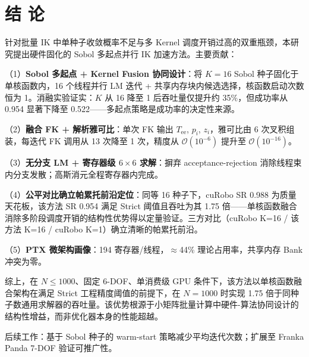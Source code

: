 \documentclass[twocolumn,a4paper,10pt]{ctexart}
\begin{document}
\FloatBarrier
\section{结 论}

针对批量 IK 中单种子收敛概率不足与多 Kernel 调度开销过高的双重瓶颈，本研究提出硬件固化的 Sobol 多起点并行 IK 加速方法。主要贡献：

（1）\textbf{Sobol 多起点 + Kernel Fusion 协同设计}：将 $K=16$ Sobol 种子固化于单核函数内，16 个线程并行 LM 迭代 + 共享内存块内候选选择，核函数启动次数恒为 1。消融实验证实：$K$ 从 16 降至 1 后吞吐量仅提升约 35\%，但成功率从 0.954 显著下降至 0.522——多起点策略是成功率的决定性来源。

（2）\textbf{融合 FK + 解析雅可比}：单次 FK 输出 $T_{\mathrm{ee}}$, $p_i$, $z_i$，雅可比由 6 次叉积组装，每迭代 FK 调用从 13 次降至 1 次，精度从 $\mathcal{O}(10^{-6})$ 提升至 $\mathcal{O}(10^{-16})$。

（3）\textbf{无分支 LM + 寄存器级 $6\times6$ 求解}：摒弃 acceptance-rejection 消除线程束内分支发散；高斯消元全程寄存器内完成。

（4）\textbf{公平对比确立帕累托前沿定位}：同等 16 种子下，cuRobo SR 0.988 为质量天花板，该方法 SR 0.954 满足 Strict 阈值且吞吐为其 1.75 倍——单核函数融合消除多阶段调度开销的结构性优势得以定量验证。三方对比（cuRobo K=16 / 该方法 K=16 / cuRobo K=1）确立清晰的帕累托前沿。

（5）\textbf{PTX 微架构画像}：194 寄存器/线程，$\approx$44\% 理论占用率，共享内存 Bank 冲突为零。

综上，在 $N\le1000$、固定 6-DOF、单消费级 GPU 条件下，该方法以单核函数融合架构在满足 Strict 工程精度阈值的前提下，在 $N=1000$ 时实现 1.75 倍于同种子数通用求解器的吞吐量。该优势根源于小矩阵批量计算中硬件-算法协同设计的结构性增益，而非优化器本身的性能超越。

后续工作：基于 Sobol 种子的 warm-start 策略减少平均迭代次数；扩展至 Franka Panda 7-DOF 验证可推广性。
\end{document}
